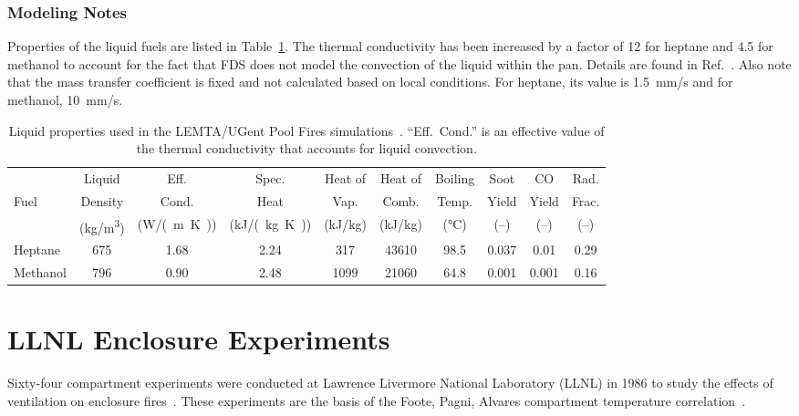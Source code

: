 \subsubsection{Modeling Notes}

Properties of the liquid fuels are listed in Table~\ref{LEMTA_UGent_Fuels}. The thermal conductivity has been increased by a factor of 12 for heptane and 4.5 for methanol to account for the fact that FDS does not model the convection of the liquid within the pan. Details are found in Ref.~\cite{Beji:FSJ2024}. Also note that the mass transfer coefficient is fixed and not calculated based on local conditions. For heptane, its value is 1.5~mm/s and for methanol, 10~mm/s.

\begin{table}[!htb]
\centering
\caption[Liquid properties used in the LEMTA/UGent Pool Fires simulations]{Liquid properties used in the LEMTA/UGent Pool Fires simulations~\cite{Sikanen:2016}. ``Eff.~Cond.'' is an effective value of the thermal conductivity that accounts for liquid convection.}
\begin{tabular}{|l|c|c|c|c|c|c|c|c|c|}
\hline
           & Liquid     & Eff.     & Spec.         & Heat of        & Heat of      & Boiling       & Soot   & CO     & Rad.     \\
Fuel       & Density    & Cond.    & Heat          & Vap.           & Comb.        & Temp.         & Yield  & Yield  & Frac.    \\
           & (\unit{kg/m^3}) & (\unit{W/(m.K)})  & (\unit{kJ/(kg.K)})     & (kJ/kg)        & (kJ/kg)      & (\unit{\degreeCelsius})   & (--)   & (--)   & (--)     \\ \hline \hline
Heptane    & 675        & 1.68     & 2.24          & 317            & 43610        & 98.5          & 0.037  & 0.01   & 0.29     \\ \hline
Methanol   & 796        & 0.90     & 2.48          & 1099           & 21060        & 64.8          & 0.001  & 0.001  & 0.16     \\ \hline
\end{tabular}
\label{LEMTA_UGent_Fuels}
\end{table}


\section{LLNL Enclosure Experiments}
\label{LLNL_Enclosure_Description}

Sixty-four compartment experiments were conducted at Lawrence Livermore National Laboratory (LLNL) in 1986 to study the effects of ventilation on enclosure fires~\cite{Foote:LLNL1986}. These experiments are the basis of the Foote, Pagni, Alvares compartment temperature correlation~\cite{Foote:IAFSS1}.

